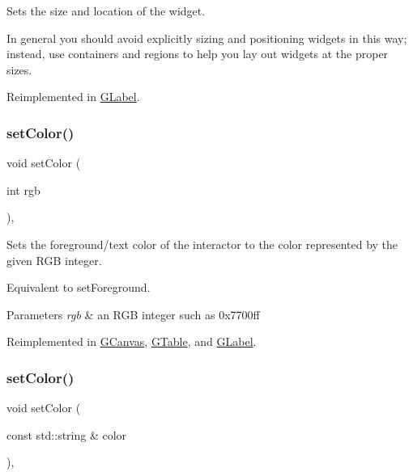 Sets the size and location of the widget. 

In general you should avoid explicitly sizing and positioning widgets in this way; instead, use containers and regions to help you lay out widgets at the proper sizes. 

Reimplemented in \mbox{\hyperlink{classGLabel_a3ed96c7e7adaf111848a90978621066c}{G\+Label}}.

\mbox{\label{classGInteractor_ab1f5cc0f5cc6bbbd716a526c61f1081d}} 
\subsubsection{\texorpdfstring{set\+Color()}{setColor()}\hspace{0.1cm}{\footnotesize\ttfamily [1/2]}}
{\footnotesize\ttfamily void set\+Color (\begin{DoxyParamCaption}\item[{int}]{rgb }\end{DoxyParamCaption})\hspace{0.3cm}{\ttfamily [virtual]}, {\ttfamily [inherited]}}



Sets the foreground/text color of the interactor to the color represented by the given R\+GB integer. 

Equivalent to set\+Foreground. 
\begin{DoxyParams}{Parameters}
{\em rgb} & an R\+GB integer such as 0x7700ff \\
\hline
\end{DoxyParams}


Reimplemented in \mbox{\hyperlink{classGCanvas_a292eb0ce61f3fdb1d28b17e1e34928f7}{G\+Canvas}}, \mbox{\hyperlink{classGTable_afd1f50a2c4695c79b8633d860bce5398}{G\+Table}}, and \mbox{\hyperlink{classGLabel_afd1f50a2c4695c79b8633d860bce5398}{G\+Label}}.

\mbox{\label{classGInteractor_a61374df6c11b52cfbb0815decdbaebc6}} 
\subsubsection{\texorpdfstring{set\+Color()}{setColor()}\hspace{0.1cm}{\footnotesize\ttfamily [2/2]}}
{\footnotesize\ttfamily void set\+Color (\begin{DoxyParamCaption}\item[{const std\+::string \&}]{color }\end{DoxyParamCaption})\hspace{0.3cm}{\ttfamily [virtual]}, {\ttfamily [inherited]}}



